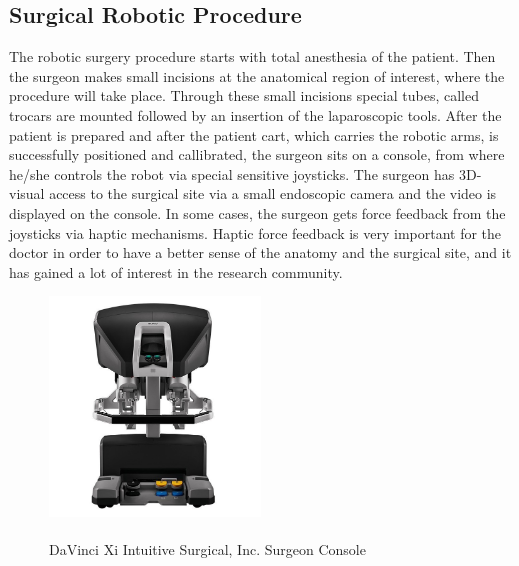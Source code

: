 \subsection{Surgical Robotic Procedure}

The robotic surgery procedure starts with total anesthesia of the patient. Then the surgeon makes small incisions at the anatomical region of interest, where the procedure will take place. Through these small incisions special tubes, called trocars are mounted followed by an insertion of the laparoscopic tools. After the patient is prepared and after the patient cart, which carries the robotic arms, is successfully positioned and callibrated, the surgeon sits on a console, from where he/she controls the robot via special sensitive joysticks. The surgeon has 3D-visual access to the surgical site via a small endoscopic camera and the video is displayed on the console. In some cases, the surgeon gets force feedback from the joysticks via haptic mechanisms. Haptic force feedback is very important for the doctor in order to have a better sense of the anatomy and the surgical site, and it has gained a lot of interest in the research community.

\begin{center}
\begin{figure}[htbp]
\centering
\includegraphics[width=0.5\textwidth]{images/intuitive-davinci-console-front-lowres.jpg}\\
\caption[DaVinci Xi \textsuperscript {} Intuitive Surgical, Inc. Surgeon Console]{DaVinci Xi \textsuperscript {} Intuitive Surgical, Inc. Surgeon Console \footnotemark}
\end{figure}
\end{center}

